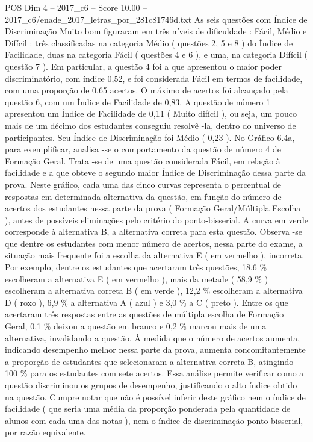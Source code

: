 \begin{textsample}{POS Dim 4 – 2017\_c6 – Score 10.00 – 2017\_c6/enade\_2017\_letras\_por\_281c81746d.txt}
As seis questões com Índice de Discriminação Muito bom figuraram em três níveis de dificuldade : Fácil, Médio e Difícil : três classificadas na categoria Médio ( questões 2, 5 e 8 ) do Índice de Facilidade, duas na categoria Fácil ( questões 4 e 6 ), e uma, na categoria Difícil ( questão 7 ).
Em particular, a questão 4 foi a que apresentou o maior poder discriminatório, com índice 0,52, e foi considerada Fácil em termos de facilidade, com uma proporção de 0,65 acertos.
O máximo de acertos foi alcançado pela questão 6, com um Índice de Facilidade de 0,83.
A questão de número 1 apresentou um Índice de Facilidade de 0,11 ( Muito difícil ), ou seja, um pouco mais de um décimo dos estudantes conseguiu resolvê -la, dentro do universo de participantes.
Seu Índice de Discriminação foi Médio ( 0,23 ).
No Gráfico 6.4a, para exemplificar, analisa -se o comportamento da questão de número 4 de Formação Geral.
Trata -se de uma questão considerada Fácil, em relação à facilidade e a que obteve o segundo maior Índice de Discriminação dessa parte da prova.
Neste gráfico, cada uma das cinco curvas representa o percentual de respostas em determinada alternativa da questão, em função do número de acertos dos estudantes nessa parte da prova ( Formação Geral/Múltipla Escolha ), antes de possíveis eliminações pelo critério do ponto-bisserial.
A curva em verde corresponde à alternativa B, a alternativa correta para esta questão.
Observa -se que dentre os estudantes com menor número de acertos, nessa parte do exame, a situação mais frequente foi a escolha da alternativa E ( em vermelho ), incorreta.
Por exemplo, dentre os estudantes que acertaram três questões, 18,6 \% escolheram a alternativa E ( em vermelho ), mais da metade ( 58,9 \% ) escolheram a alternativa correta B ( em verde ), 12,2 \% escolheram a alternativa D ( roxo ), 6,9 \% a alternativa A ( azul ) e 3,0 \% a C ( preto ).
Entre os que acertaram três respostas entre as questões de múltipla escolha de Formação Geral, 0,1 \% deixou a questão em branco e 0,2 \% marcou mais de uma alternativa, invalidando a questão.
À medida que o número de acertos aumenta, indicando desempenho melhor nessa parte da prova, aumenta concomitantemente a proporção de estudantes que selecionaram a alternativa correta B, atingindo 100 \% para os estudantes com sete acertos.
Essa análise permite verificar como a questão discriminou os grupos de desempenho, justificando o alto índice obtido na questão.
Cumpre notar que não é possível inferir deste gráfico nem o índice de facilidade ( que seria uma média da proporção ponderada pela quantidade de alunos com cada uma das notas ), nem o índice de discriminação ponto-bisserial, por razão equivalente.

\end{textsample}
